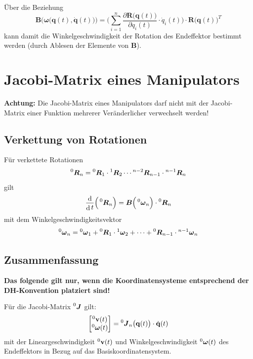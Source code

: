 \documentclass[a4paper, 11pt, accentcolor = tud3b]{tudreport}
\DeclareMathOperator{\total}{d}
\newcommand{\inreferenceto}[2]{\prescript{#1}{}{#2}}
\newcommand{\mat}[1]{\boldsymbol{#1}}
\renewcommand{\vec}[1]{\boldsymbol{\mathbf{#1}}}
\begin{document}
			Über die Beziehung
			\begin{equation*}
				\mat{B}\Big(\!\vec{\omega}\big(\vec{q}(t), \dot{\vec{q}}(t)\big)\!\Big) = \Bigg( \sum_{i = 1}^{n} \frac{\partial \mat{R}\big(\vec{q}(t)\big)}{\partial q_i(t)} \cdot \dot{q}_i(t) \!\Bigg) \cdot \mat{R}\big(\vec{q}(t)\big)^T
			\end{equation*}
			kann damit die Winkelgeschwindigkeit der Rotation des Endeffektor bestimmt werden (durch Ablesen der Elemente von \(\mat{B}\)).

		\section{Jacobi-Matrix eines Manipulators}
			\textbf{Achtung:} Die Jacobi-Matrix eines Manipulators darf nicht mit der Jacobi-Matrix einer Funktion mehrerer Veränderlicher verwechselt werden!
			
			\subsection{Verkettung von Rotationen}
				Für verkettete Rotationen
				\begin{equation*}
					\inreferenceto{0}{\mat{R}}_n = \inreferenceto{0}{\mat{R}}_1 \cdot \inreferenceto{1}{\mat{R}}_2 \cdots \inreferenceto{n - 2}{\mat{R}}_{n - 1} \cdot \inreferenceto{n - 1}{\mat{R}}_n
				\end{equation*}
				gilt
				\begin{equation*}
					\frac{\total}{\total t} \Big( \inreferenceto{0}{\mat{R}}_n \Big) = \mat{B}\Big(\inreferenceto{0}{\vec{\omega}}_n\Big) \cdot \inreferenceto{0}{\mat{R}}_n
				\end{equation*}
				mit dem Winkelgeschwindigkeitsvektor
				\begin{equation*}
					\inreferenceto{0}{\vec{\omega}}_n = \inreferenceto{0}{\vec{\omega}}_1 + \inreferenceto{0}{\mat{R}}_1 \cdot \inreferenceto{1}{\vec{\omega}}_2 + \cdots + \inreferenceto{0}{\mat{R}}_{n - 1} \cdot \inreferenceto{n - 1}{\vec{\omega}}_n
				\end{equation*}

			\subsection{Zusammenfassung}
				\textbf{Das folgende gilt nur, wenn die Koordinatensysteme entsprechend der DH-Konvention platziert sind!}
			
				Für die Jacobi-Matrix \( \inreferenceto{0}{\mat{J}} \) gilt:
				\begin{equation*}
					\begin{bmatrix}
						\inreferenceto{0}{\vec{v}}(t) \\
						\inreferenceto{0}{\vec{\omega}}(t)
					\end{bmatrix}
					=
					\inreferenceto{0}{\mat{J}}_n\big(\vec{q}(t)\big) \cdot \dot{\vec{q}}(t)
				\end{equation*}
				mit der Lineargeschwindigkeit \( \inreferenceto{0}{\vec{v}}(t) \) und Winkelgeschwindigkeit \( \inreferenceto{0}{\vec{\omega}}(t) \) des Endeffektors in Bezug auf das Basiskoordinatensystem.
				
\end{document}
